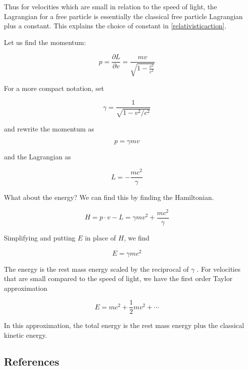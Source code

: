  




Thus for velocities which are small in relation to the speed of light, the Lagrangian for a free particle is essentially the classical free particle Lagrangian plus a constant.  This explains the choice of constant in \eqref{relativisticaction}.

Let us find the momentum:

\begin{equation}
p = \frac{\partial L}{\partial v} = \frac{mv}{\sqrt{1 - \frac{ v^2}{ c^2}}}
\end{equation}

For a more compact notation, set 

\begin{equation}
\gamma = \frac{1}{\sqrt{1 - v^2 /c^2}}
\end{equation}

and rewrite the momentum as 

\begin{equation}
 p = \gamma mv
\end{equation}

and the Lagrangian as 

\begin{equation}
L = - \frac{mc^2}{\gamma} 
\end{equation}


What about the energy?  We can find this by finding the Hamiltonian.

\begin{equation}
H = p\cdot v - L = \gamma mv^2 +   \frac{mc^2 }{\gamma}
\end{equation}

Simplifying and putting $E$ in place of $H$, we find

\begin{equation}
E = \gamma m c^2 
\end{equation}

The energy is the rest mass energy scaled by the reciprocal of $\gamma$ . For velocities that are small compared to the speed of light, we have the first order Taylor approximation

\begin{equation}
E = mc^2 + \frac{1}{2}mv^2 + \cdots
\end{equation}

In this approximation, the total energy is the rest mass energy plus the classical kinetic energy.


\subsection{References}

